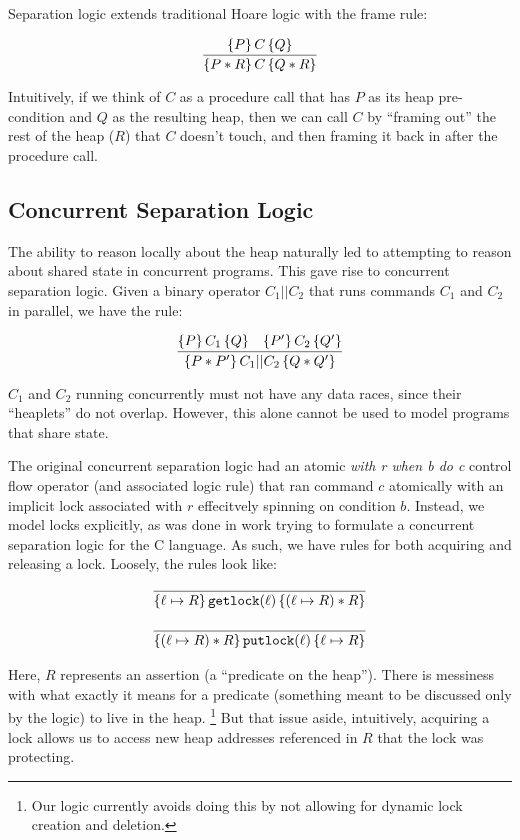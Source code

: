 Separation logic extends traditional Hoare logic\cite{hoare1969axiomatic} with
the frame rule:

\[
\infer{\hoaretrip{P * R}{C}{Q * R}}{\hoaretrip{P}{C}{Q}}
\]

Intuitively, if we think of $C$ as a procedure call that has $P$ as its heap
pre-condition and $Q$ as the resulting heap, then we can call $C$ by ``framing
out'' the rest of the heap ($R$) that $C$ doesn't touch, and then framing it
back in after the procedure call.

\subsection{Concurrent Separation Logic}

The ability to reason locally about the heap naturally led to attempting to
reason about shared state in concurrent programs.
This gave rise to concurrent
separation logic\cite{o2007resources}.
Given a binary operator $C_1 || C_2$ that
runs commands $C_1$ and $C_2$ in parallel, we have the rule:

\[
    \infer{\hoaretrip{P * P'}{C_1 || C_2}{Q * Q'}}{\hoaretrip{P}{C_1}{Q} &
						   \hoaretrip{P'}{C_2}{Q'}}
\]

$C_1$ and $C_2$ running concurrently must not have any data races, since their
``heaplets'' do not overlap.
However, this alone cannot be used to model
programs that share state.

The original concurrent separation logic had an atomic \textit{with r when b do
c} control flow operator (and associated logic rule) that ran command $c$
atomically with an implicit lock associated with $r$ effecitvely spinning on
condition $b$.
Instead, we model locks explicitly, as was done in work trying
to formulate a concurrent separation logic for the C
language. \cite{hobor2008oracle}
As such, we have rules for both acquiring and
releasing a lock.
Loosely, the rules look like:

\begin{align*}
    \infer{\hoaretrip{\ell \mapsto R}{\texttt{getlock}(\ell)}{(\ell \mapsto R) *
    R}}{} \\[+9px]
    \infer{\hoaretrip{(\ell \mapsto R) * R}{\texttt{putlock}(\ell)}{\ell \mapsto R}}{}
\end{align*}

Here, $R$ represents an assertion (a ``predicate on the heap'').
There is
messiness with what exactly it means for a predicate (something meant to be
discussed only by the logic) to live in the heap.
\footnote{Our logic currently
avoids doing this by not allowing for dynamic lock creation and
deletion.}
But
that issue aside, intuitively, acquiring a lock allows us to access new heap
addresses referenced in $R$ that the lock was protecting.


